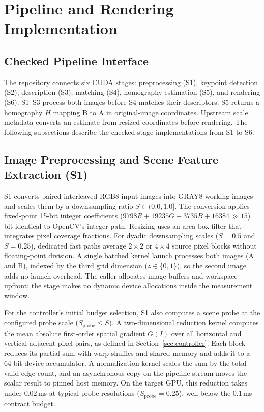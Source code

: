 \section{Pipeline and Rendering Implementation}
\label{sec:pipeline}
\subsection{Checked Pipeline Interface}
The repository connects six CUDA stages: preprocessing (S1), keypoint detection
(S2), description (S3), matching (S4), homography estimation (S5), and rendering
(S6). S1--S3 process both images before S4 matches their descriptors. S5 returns
a homography $H$ mapping B to A in original-image coordinates. Upstream scale
metadata converts an estimate from resized coordinates before rendering.
The following subsections describe the checked stage implementations from S1 to S6.

\subsection{Image Preprocessing and Scene Feature Extraction (S1)}
\label{sec:s1}
S1 converts paired interleaved RGB8 input images into GRAY8 working images and scales
them by a downsampling ratio $S \in (0.0, 1.0]$. The conversion applies fixed-point
15-bit integer coefficients ($9798 R + 19235 G + 3735 B + 16384 \gg 15$) bit-identical
to OpenCV's integer path. Resizing uses an area box filter that integrates pixel coverage
fractions. For dyadic downsampling scales ($S=0.5$ and $S=0.25$), dedicated fast paths
average $2\times 2$ or $4\times 4$ source pixel blocks without floating-point division.
A single batched kernel launch processes both images (A and B), indexed by the third
grid dimension ($z \in \{0, 1\}$), so the second image adds no launch overhead.
The caller allocates image buffers and workspace upfront; the stage makes no
dynamic device allocations inside the measurement window.

For the controller's initial budget selection, S1 also computes a scene probe at
the configured probe scale ($S_{\text{probe}} \le S$). A two-dimensional reduction
kernel computes the mean absolute first-order spatial gradient $G(I)$ over all
horizontal and vertical adjacent pixel pairs, as defined in
Section~\ref{sec:controller}. Each block reduces its partial sum with warp shuffles
and shared memory and adds it to a 64-bit device accumulator. A normalization
kernel scales the sum by the total valid edge count, and an asynchronous copy on
the pipeline stream moves the scalar result to pinned host memory. On the target
GPU, this reduction takes under $0.02$\,ms at typical probe resolutions
($S_{\text{probe}}=0.25$), well below the $0.1$\,ms contract budget.

